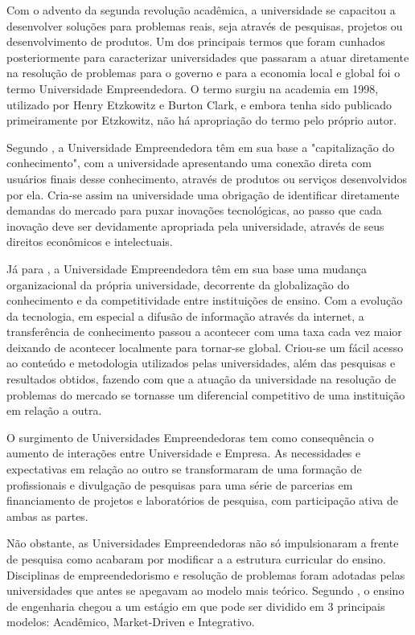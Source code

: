 Com o advento da segunda revolução acadêmica, a universidade se capacitou a desenvolver soluções para problemas reais, seja através de pesquisas, projetos ou desenvolvimento de produtos. Um dos principais termos que foram cunhados posteriormente para caracterizar universidades que passaram a atuar diretamente na resolução de problemas para o governo e para a economia local e global foi o termo Universidade Empreendedora. O termo surgiu na academia em 1998, utilizado por Henry Etzkowitz e Burton Clark, e embora tenha sido publicado primeiramente por Etzkowitz, não há apropriação do termo pelo próprio autor.

Segundo , a Universidade Empreendedora têm em sua base a "capitalização do conhecimento", com a universidade apresentando uma conexão direta com usuários finais desse conhecimento, através de produtos ou serviços desenvolvidos por ela. Cria-se assim na universidade uma obrigação de identificar diretamente demandas do mercado para puxar inovações tecnológicas, ao passo que cada inovação deve ser devidamente apropriada pela universidade, através de seus direitos econômicos e intelectuais.

Já para , a Universidade Empreendedora têm em sua base uma mudança organizacional da própria universidade, decorrente da globalização do conhecimento e da competitividade entre instituições de ensino. Com a evolução da tecnologia, em especial a difusão de informação através da internet, a transferência de conhecimento passou a acontecer com uma taxa cada vez maior deixando de acontecer localmente para tornar-se global. Criou-se um fácil acesso ao conteúdo e metodologia utilizados pelas universidades, além das pesquisas e resultados obtidos, fazendo com que a atuação da universidade na resolução de problemas do mercado se tornasse um diferencial competitivo de uma instituição em relação a outra.

O surgimento de Universidades Empreendedoras tem como consequência o aumento de interações entre Universidade e Empresa. As necessidades e expectativas em relação ao outro se transformaram de uma formação de profissionais e divulgação de pesquisas para uma série de parcerias em financiamento de projetos e laboratórios de pesquisa, com participação ativa de ambas as partes.

Não obstante, as Universidades Empreendedoras não só impulsionaram a frente de pesquisa como acabaram por modificar a a estrutura curricular do ensino. Disciplinas de empreendedorismo e resolução de problemas foram adotadas pelas universidades que antes se apegavam ao modelo mais teórico. Segundo , o ensino de engenharia chegou a um estágio em que pode ser dividido em 3 principais modelos: Acadêmico, Market-Driven e Integrativo.

